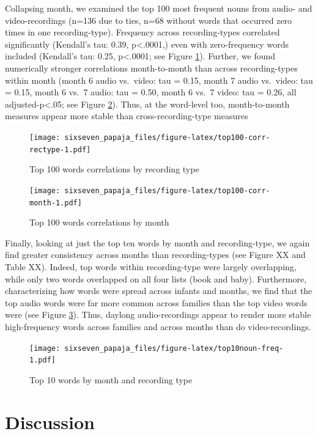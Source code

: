 \documentclass[floatsintext,man]{apa6}
\theoremstyle{definition}
\theoremstyle{definition}
\theoremstyle{definition}
\theoremstyle{remark}
\begin{document}
Collapsing month, we examined the top 100 most frequent nouns from
audio- and video-recordings (n=136 due to ties, n=68 without words that
occurred zero times in one recording-type). Frequency across
recording-types correlated significantly (Kendall's tau: 0.39,
p\textless{}.0001,) even with zero-frequency words included (Kendall's
tau: 0.25, p\textless{}.0001; see Figure \ref{fig:top100-corr-rectype}).
Further, we found numerically stronger correlations month-to-month than
across recording-types within month (month 6 audio vs.~video: tau =
0.15, month 7 audio vs.~video: tau = 0.15, month 6 vs.~7 audio: tau =
0.50, month 6 vs.~7 video: tau = 0.26, all adjusted-p\textless{}.05; see
Figure \ref{fig:top100-corr-month}). Thus, at the word-level too,
month-to-month measures appear more stable than cross-recording-type
measures

\begin{figure}[htbp]
\centering
\texttt{[image: sixseven\_papaja\_files/figure-latex/top100-corr-rectype-1.pdf]}
\caption{\label{fig:top100-corr-rectype}Top 100 words correlations by
recording type}
\end{figure}

\begin{figure}[htbp]
\centering
\texttt{[image: sixseven\_papaja\_files/figure-latex/top100-corr-month-1.pdf]}
\caption{\label{fig:top100-corr-month}Top 100 words correlations by month}
\end{figure}

Finally, looking at just the top ten words by month and recording-type,
we again find greater consistency across months than recording-types
(see Figure XX and Table XX). Indeed, top words within recording-type
were largely overlapping, while only two words overlapped on all four
lists (book and baby). Furthermore, characterizing how words were spread
across infants and months, we find that the top audio words were far
more common across families than the top video words were (see Figure
\ref{fig:top10noun-freq}). Thus, daylong audio-recordings appear to
render more stable high-frequency words across families and across
months than do video-recordings.

\begin{figure}[htbp]
\centering
\texttt{[image: sixseven\_papaja\_files/figure-latex/top10noun-freq-1.pdf]}
\caption{\label{fig:top10noun-freq}Top 10 words by month and recording type}
\end{figure}

\section{Discussion}\label{discussion}
\end{document}
